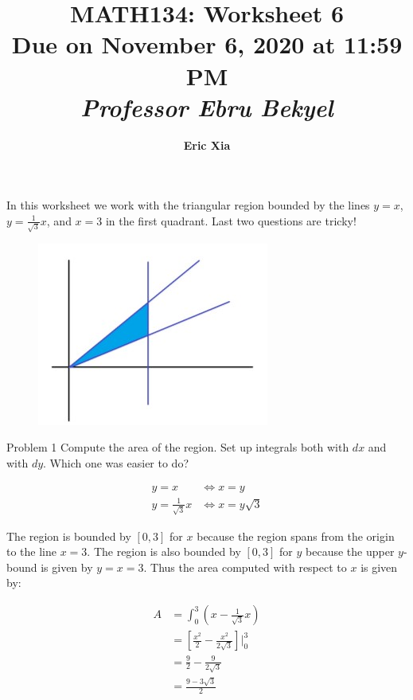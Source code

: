 \documentclass{article}
\title{
    \vspace{2in}
    \textmd{\textbf{MATH134: Worksheet 6}}\\
    \normalsize\vspace{0.1in}\small{Due on November 6, 2020 at 11:59 PM}\\
    \vspace{0.1in}\large{\textit{Professor Ebru Bekyel}}
    \vspace{3in}
}
\author{\textbf{Eric Xia}}
\date{}
\begin{document}
    \maketitle
    \pagebreak

    \thispagestyle{2}

    \color{blue} In this worksheet we work with the triangular region bounded by the lines $y=x$, $y=\frac{1}{\sqrt{3}}x$, and $x=3$ in the first quadrant. Last two questions are tricky! \color{black}

    \begin{figure}[hbt!]
        \centering
        \includegraphics[]{volumes}
    \end{figure}

    \begin{tbhtheorem}{Problem 1}
        Compute the area of the region. Set up integrals both with $dx$ and with $dy$. Which one was easier to do?
    \end{tbhtheorem}

    \begin{align*}
        y = x                   &\iff   x = y \\
        y = \frac{1}{\sqrt{3}}x &\iff   x = y\sqrt{3}
    \end{align*}

    The region is bounded by $[0,3]$ for $x$ because the region spans from the origin to the line $x=3$. The region is also bounded by $[0,3]$ for $y$ because the upper $y$-bound is given by $y=x=3$. Thus the area
    computed with respect to $x$ is given by:

    \begin{align*}
        A   &= \int^3_0 \left(x-\frac{1}{\sqrt{3}}x\right) \\
            &= \left[\frac{x^2}{2}-\frac{x^2}{2\sqrt{3}}\right] \Bigg|^3_0 \\
            &= \frac{9}{2} - \frac{9}{2\sqrt{3}} \\
            &= \frac{9-3\sqrt{3}}{2}
    \end{align*}
\end{document}
